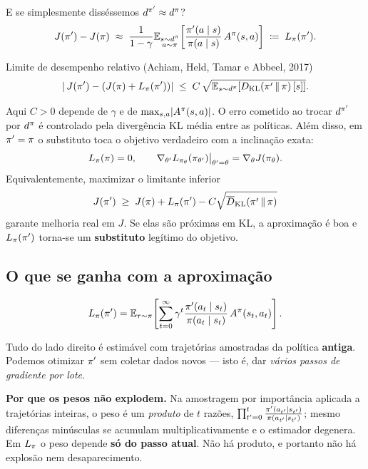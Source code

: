\documentclass[11pt, a4paper]{article}
\newcommand{\Adv}{A}
\newcommand{\polnovo}{\pol'}
\newcommand{\dpol}{d^{\pol}}
\newcommand{\dpolnovo}{d^{\pol'}}
\newcommand{\KLd}[2]{D_{\mathrm{KL}}\!\left(#1\,\|\,#2\right)}
\newcommand{\KLbar}{\overline{D}_{\mathrm{KL}}}
\newcommand{\Lsub}[1]{L_{#1}}
\begin{document}
E se simplesmente disséssemos $\dpolnovo \approx \dpol$?
\[
  J(\polnovo) - J(\pol) \;\approx\;
  \frac{1}{1-\gamma}\E_{\substack{s\sim\dpol\\ a\sim\pol}}\!\left[
  \frac{\polnovo(a\mid s)}{\pol(a\mid s)}\,\Adv^{\pol}(s,a)\right]
  \;\defeq\; \Lsub{\pol}(\polnovo).
\]

\begin{teobox}{Limite de desempenho relativo \normalfont (Achiam, Held, Tamar e Abbeel, 2017)}
\[
  \abs{\,J(\polnovo) - \left(J(\pol) + \Lsub{\pol}(\polnovo)\right)}
  \;\le\; C\,\sqrt{\E_{s\sim\dpol}\!\left[\KLd{\polnovo}{\pol}[s]\right]}.
\]
\end{teobox}

Aqui $C>0$ depende de $\gamma$ e de $\max_{s,a}\abs{\Adv^{\pol}(s,a)}$. O erro
cometido ao trocar $\dpolnovo$ por $\dpol$ é controlado pela divergência KL
média entre as políticas. Além disso, em $\polnovo = \pol$ o substituto toca o
objetivo verdadeiro com a inclinação exata:
\[
  \Lsub{\pol}(\pol) = 0,
  \qquad
  \nabla_{\theta'}\Lsub{\pol_\theta}(\pol_{\theta'})\big|_{\theta'=\theta} = \nabla_\theta J(\pol_\theta).
\]
Equivalentemente, maximizar o limitante inferior
\[
  J(\polnovo) \;\ge\; J(\pol) + \Lsub{\pol}(\polnovo) - C\sqrt{\KLbar(\polnovo\,\|\,\pol)}
\]
garante melhoria real em $J$. Se elas são próximas em KL, a aproximação é boa e
$\Lsub{\pol}(\polnovo)$ torna-se um \textbf{substituto} legítimo do objetivo.


\subsection{O que se ganha com a aproximação}

\[
  \Lsub{\pol}(\polnovo)
  = \E_{\tau\sim\pol}\!\left[\sum_{t=0}^{\infty}\gamma^t
    \frac{\polnovo(a_t\mid s_t)}{\pol(a_t\mid s_t)}\,\Adv^{\pol}(s_t,a_t)\right].
\]

Tudo do lado direito é estimável com trajetórias amostradas da política
\textbf{antiga}. Podemos otimizar $\polnovo$ sem coletar dados novos --- isto
é, dar \emph{vários passos de gradiente por lote}.

\begin{ideiabox}
\textbf{Por que os pesos não explodem.} Na amostragem por importância aplicada
a trajetórias inteiras, o peso é um \emph{produto} de $t$ razões,
$\prod_{t'=0}^{t}\frac{\polnovo(a_{t'}\mid s_{t'})}{\pol(a_{t'}\mid s_{t'})}$;
mesmo diferenças minúsculas se acumulam multiplicativamente e o estimador
degenera. Em $\Lsub{\pol}$ o peso depende \textbf{só do passo atual}. Não há
produto, e portanto não há explosão nem desaparecimento.
\end{ideiabox}
\end{document}
